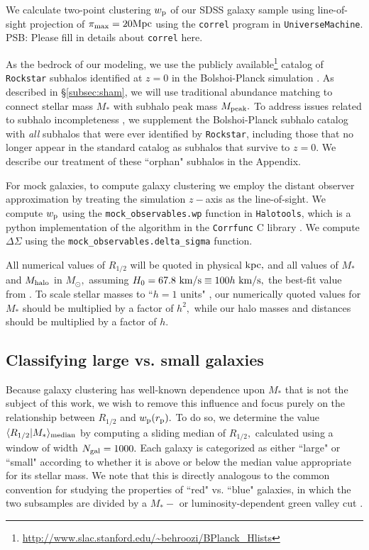 \documentclass[usenatbib,usegraphicx,letterpaper]{mn2e}
\newcommand{\rhalf}{R_{1/2}}
\newcommand{\mstar}{M_{\ast}}
\newcommand{\mpeak}{M_{\rm peak}}
\newcommand{\mhalo}{M_{\rm halo}}
\newcommand{\rproj}{r_{\rm p}}
\newcommand{\wproj}{w_{\rm p}}
\newcommand{\median}[2]{\langle{#1}\vert{#2}\rangle_{\rm median}}
\newcommand{\kpc}{{\rm kpc}}
\newcommand{\mpc}{{\rm Mpc}}
\newcommand{\msun}{M_\odot}
\newcommand{\kms}{{\rm km/s}}
\begin{document}
We calculate two-point clustering $\wproj$ of our SDSS galaxy sample using line-of-sight projection of $\pi_{\rm max}=20\mpc$ using the {\tt correl} program in {\tt UniverseMachine}. {\color{red} PSB: Please fill in details about {\tt correl} here}.

As the bedrock of our modeling, we use the publicly available\footnote{\url{http://www.slac.stanford.edu/~behroozi/BPlanck\_Hlists}} catalog of {\tt Rockstar} subhalos identified at $z=0$ in the Bolshoi-Planck simulation \citep{klypin_etal11,behroozi12_rockstar,behroozi12_consistent_trees,riebe_etal13,rodriguez_puebla16_bolplanck}. As described in \S\ref{subsec:sham}, we will use traditional abundance matching to connect stellar mass $\mstar$ with subhalo peak mass $\mpeak.$ To address issues related to subhalo incompleteness \citep{guo_white13,campbell_etal17}, we supplement the Bolshoi-Planck subhalo catalog with {\em all} subhalos that were ever identified by {\tt Rockstar}, including those that no longer appear in the standard catalog as subhalos that survive to $z=0.$ We describe our treatment of these ``orphan" subhalos in the Appendix.

For mock galaxies, to compute galaxy clustering we employ the distant observer approximation by treating the simulation $z-$axis as the line-of-sight. We compute $\wproj$ using the {\tt mock\_observables.wp} function in {\tt Halotools}, which is a python implementation of the algorithm in the {\tt Corrfunc} C library \citep{sinha_etal17}. We compute $\Delta\Sigma$ using the {\tt mock\_observables.delta\_sigma} function. 

All numerical values of $\rhalf$ will be quoted in physical $\kpc,$ and all values of $\mstar$ and $\mhalo$ in $\msun,$ assuming $H_0=67.8~\kms\equiv100h~\kms,$ the best-fit value from \citet{planck15}. To scale stellar masses to ``$h=1$ units" \citep{croton13}, our numerically quoted values for $\mstar$ should be multiplied by a factor of $h^2,$ while our halo masses and distances should be multiplied by a factor of $h.$

\subsection{Classifying large vs. small galaxies}
\label{subsec:sizedef}

Because galaxy clustering has well-known dependence upon $\mstar$ that is not the subject of this work, we wish to remove this influence and focus purely on the relationship between $\rhalf$ and $\wproj(\rproj).$ To do so, we determine the value $\median{\rhalf}{\mstar}$ by computing a sliding median of $\rhalf,$ calculated using a window of width $N_{\rm gal}=1000.$ Each galaxy is categorized as either ``large" or ``small" according to whether it is above or below the median value appropriate for its stellar mass. We note that this is directly analogous to the common convention for studying the properties of ``red" vs. ``blue" galaxies, in which the two subsamples are divided by a $\mstar-$ or luminosity-dependent green valley cut \citep[e.g.,][]{vdB_etal08,zehavi_etal11}. 
\end{document}
